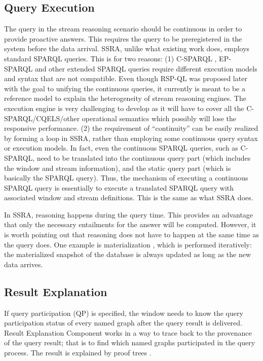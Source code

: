 \subsection{Query Execution}
The query in the stream reasoning scenario should be continuous in order to provide proactive answers. 
This requires the query to be preregistered in the system before the data arrival.
SSRA, unlike what existing work does, employs standard SPARQL queries.
This is for two reasons:
(1) C-SPARQL \cite{barbieri2009c}, EP-SPARQL \cite{anicic2011ep} and other extended SPARQL queries require different execution models and syntax that are not compatible.
Even though RSP-QL \cite{dell2014rsp} was proposed later with the goal to unifying the continuous queries, it currently is meant to be a reference model to explain the heterogeneity of stream reasoning engines. 
The execution engine is very challenging to develop as it will have to cover all the C-SPARQL/CQELS/other operational semantics which possibly will lose the responsive performance.
(2) the requirement of ``continuity'' can be easily realized by forming a loop in SSRA, rather than employing some continuous query syntax or execution models. 
In fact, even the continuous SPARQL queries, such as C-SPARQL, need to be translated into the continuous query part (which includes the window and stream information), and the static query part (which is basically the SPARQL query).
Thus, the mechanism of executing a continuous SPARQL query is essentially to execute a translated SPARQL query with associated window and stream definitions.
This is the same as what SSRA does. 

In SSRA, reasoning happens during the query time. 
This provides an advantage that only the necessary entailments for the answer will be computed. 
However, it is worth pointing out that reasoning does not have to happen at the same time as the query does. 
One example is materialization \cite{barbieri2010incremental},  which is performed iteratively: the materialized snapshot of the database is always updated as long as the new data arrives. 
%
\subsection{Result Explanation}
If query participation (QP) is specified, the window needs to know the query participation status of every named graph after the query result is delivered.
Result Explanation Component works in a way to trace back to the provenance of the query result; that is to find which named graphs participated in the query process. 
The result is explained by proof trees \cite{stardogprooftree}.

